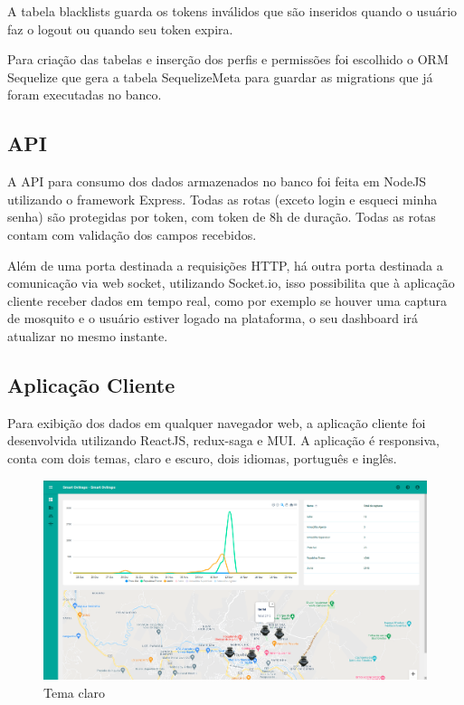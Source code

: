 \documentclass[
	12pt,				%
	openright,			%
	oneside,			%
	a4paper,			%
	chapter=TITLE,		%
	english,			%
	brazil				%
	]{abntex2}
\begin{document}
A tabela blacklists guarda os tokens
inválidos que são inseridos quando o usuário faz o logout ou quando seu token expira.

Para criação das tabelas e inserção dos perfis e permissões foi escolhido o ORM Sequelize que gera a tabela SequelizeMeta para guardar as migrations
 que já foram executadas no banco.

\subsection{API}

A API para consumo dos dados armazenados no banco foi feita em NodeJS utilizando o framework Express. Todas as rotas (exceto login e 
esqueci minha senha) são protegidas por token, com token de 8h de duração. Todas as rotas contam com validação dos campos recebidos. 

Além de uma porta destinada a requisições HTTP, há outra porta destinada a comunicação via web socket, utilizando Socket.io, isso possibilita que à aplicação cliente 
receber dados em tempo real, como por exemplo se houver uma captura de mosquito e o usuário estiver logado na plataforma, o seu dashboard irá atualizar
no mesmo instante.

\subsection{Aplicação Cliente}

Para exibição dos dados em qualquer navegador web, a aplicação cliente foi desenvolvida utilizando ReactJS, redux-saga e MUI. A aplicação é responsiva,
conta com dois temas, claro e escuro, dois idiomas, português e inglês. 

\begin{figure}[H]
\centering
\includegraphics[scale=0.20]{imagens/front_1.png}
\caption{Tema claro}
    \label{fig:light}
\end{figure}
\end{document}
